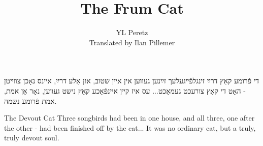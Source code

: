 \documentclass{book}
\begin{document}
\title{The Frum Cat}
\author{YL Peretz\\Translated by Ilan Pillemer}
\date{}

\maketitle
\begin{pairs}

\begin{Rightside}
\begin{RTL}
\begin{hebrew}
\beginnumbering
\pstart
די פֿרומע קאַץ
\newline
\pend
\pstart
דרײַ זינגלפֿײגעלעך זײַנען געװען אין אײן שטוב, און אַלע דרײַ, אײנס נאָכן צװײטן - האָט די קאַץ צורעכט געמאַכט...
\pend
\pstart
עס איז קײן אײנפֿאַכע קאַץ נישט געװען, נאָר אַן אמת, אמת פֿרומע נשמה.

\pend
\endnumbering
\end{hebrew}
\end{RTL}
\end{Rightside}




\begin{Leftside}
\begin{english}
\beginnumbering
\pstart
The Devout Cat
\newline
\pend
\pstart
Three songbirds had been in one house, and all three, one after the other - had been finished off by the cat...
\pend
\pstart
It was no ordinary cat, but a truly, truly devout soul.
\pend
\endnumbering
\end{english}
\end{Leftside}

\end{pairs}
\Columns
\end{document}
